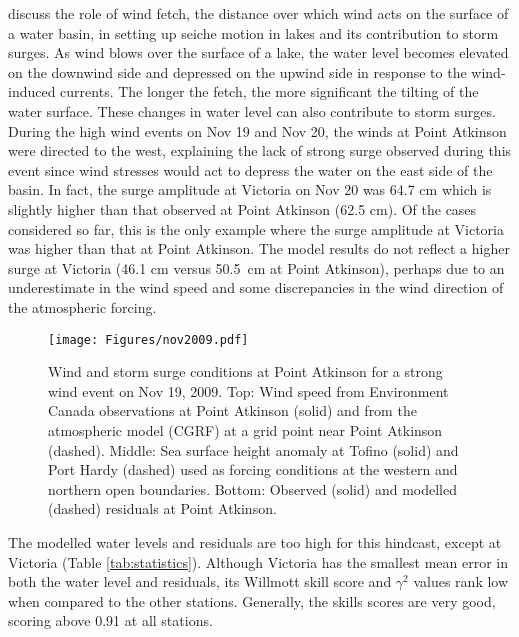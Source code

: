 \documentclass[letterpaper]{tATO2e}
\begin{document}
\citet{danard2003storm} discuss the role of wind fetch, the distance over which wind acts on the surface of a water basin, in setting up seiche motion in lakes and its contribution to storm surges. As wind blows over the surface of a lake, the water level becomes elevated on the downwind side and depressed on the upwind side in response to the wind-induced currents. The longer the fetch, the more significant the tilting of the water surface. These changes in water level can also contribute to storm surges.  During the high wind events on Nov 19 and Nov 20, the winds at Point Atkinson were directed to the west, explaining the lack of strong surge observed during this event since wind stresses would act to depress the water on the east side of the basin. In fact, the surge amplitude at Victoria on Nov 20 was 64.7 cm which is slightly higher than that observed at Point Atkinson (62.5 cm). Of the cases considered so far, this is the only example where the surge amplitude at Victoria was higher than that at Point Atkinson. The model results do not reflect a higher surge at Victoria (46.1 cm versus 50.5~cm at Point Atkinson), perhaps due to an underestimate in the wind speed and some discrepancies in the wind direction of the atmospheric forcing.  


\begin{figure}
\centering
\texttt{[image: Figures/nov2009.pdf]}
\caption{Wind and storm surge conditions at Point Atkinson for a strong wind event on Nov 19, 2009. Top: Wind speed from Environment Canada observations \citep{ECClimateArchive} at Point Atkinson (solid) and from the atmospheric model (CGRF) at a grid point near Point Atkinson (dashed). Middle: Sea surface height anomaly at Tofino (solid) and Port Hardy (dashed) used as forcing conditions at the western and northern open boundaries. Bottom: Observed (solid) and modelled (dashed) residuals at Point Atkinson.  }
\label{fig:nov2009}
\end{figure}

The modelled water levels and residuals are too high for this hindcast, except at Victoria (Table \ref{tab:statistics}). Although Victoria has the smallest mean error in both the water level and residuals, its Willmott skill score and $\gamma^2$ values rank low when compared to the other stations. Generally, the skills scores are very good, scoring above 0.91 at all stations. 
\end{document}

